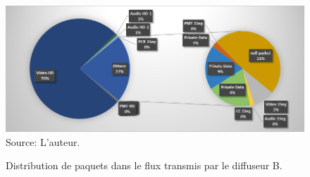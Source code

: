 \documentclass[12pt,a4paper]{article}
\begin{document}
\begin{figure}[!h]
\centering
\caption{Distribution de paquets dans le flux transmis par le diffuseur B.}
\includegraphics[width=0.9\linewidth]{pictures/graph_band_dump.png}
\\Source: L'auteur.
\label{fig:graph_band_dump}
\end{figure}
\end{document}

